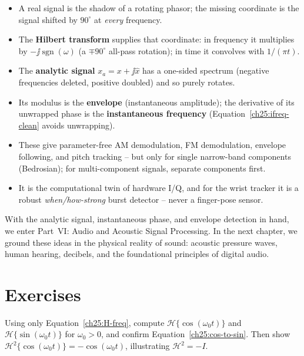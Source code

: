 \begin{itemize}
  \item A real signal is the shadow of a rotating phasor; the missing coordinate is the
        signal shifted by $90^\circ$ at \emph{every} frequency.
  \item The \textbf{Hilbert transform} supplies that coordinate: in frequency it multiplies
        by $-\jj\operatorname{sgn}(\omega)$ (a $\mp90^\circ$ all-pass rotation); in time it
        convolves with $1/(\pi t)$.
  \item The \textbf{analytic signal} $x_a=x+\jj\hat x$ has a one-sided spectrum (negative
        frequencies deleted, positive doubled) and so purely rotates.
  \item Its modulus is the \textbf{envelope} (instantaneous amplitude); the derivative of
        its unwrapped phase is the \textbf{instantaneous frequency}
        (Equation~\eqref{ch25:ifreq-clean} avoids unwrapping).
  \item These give parameter-free AM demodulation, FM demodulation, envelope following,
        and pitch tracking -- but only for single narrow-band components (Bedrosian); for
        multi-component signals, separate components first.
  \item It is the computational twin of hardware I/Q, and for the wrist tracker it is a
        robust \emph{when/how-strong} burst detector -- never a finger-pose sensor.
\end{itemize}

With the analytic signal, instantaneous phase, and envelope detection in hand, we
enter Part~VI: Audio and Acoustic Signal Processing. In the next chapter, we ground
these ideas in the physical reality of sound: acoustic pressure waves, human hearing,
decibels, and the foundational principles of digital audio.

\section{Exercises}
\label{ch25:exercises}

\begin{exercise}
\label{ch25:ex-cos}
Using only Equation~\eqref{ch25:H-freq}, compute $\mathcal{H}\{\cos(\omega_0 t)\}$ and
$\mathcal{H}\{\sin(\omega_0 t)\}$ for $\omega_0>0$, and confirm
Equation~\eqref{ch25:cos-to-sin}. Then show $\mathcal{H}^2\{\cos(\omega_0 t)\} =
-\cos(\omega_0 t)$, illustrating $\mathcal{H}^2=-I$.
\end{exercise}

